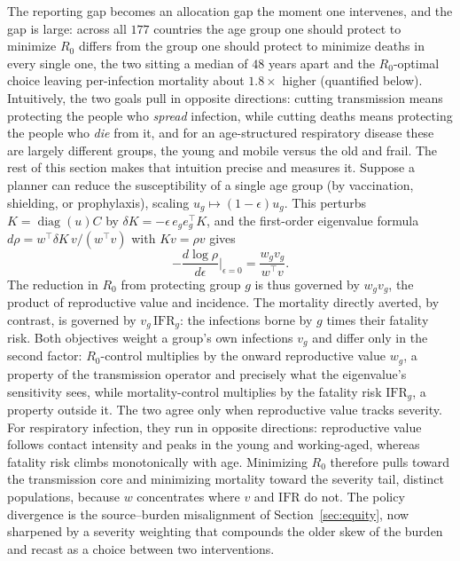 \documentclass[12pt]{article}
\begin{document}
The reporting gap becomes an allocation gap the moment one intervenes, and the gap is large: across all $177$ countries the age group one should protect to minimize $R_0$ differs from the group one should protect to minimize deaths in every single one, the two sitting a median of $48$ years apart and the $R_0$-optimal choice leaving per-infection mortality about $1.8\times$ higher (quantified below). Intuitively, the two goals pull in opposite directions: cutting transmission means protecting the people who \emph{spread} infection, while cutting deaths means protecting the people who \emph{die} from it, and for an age-structured respiratory disease these are largely different groups, the young and mobile versus the old and frail. The rest of this section makes that intuition precise and measures it. Suppose a planner can reduce the susceptibility of a single age group (by vaccination, shielding, or prophylaxis), scaling $u_g\mapsto(1-\epsilon)u_g$. This perturbs $K=\operatorname{diag}(u)C$ by $\delta K=-\epsilon\,e_g e_g^{\top}K$, and the first-order eigenvalue formula $d\rho=w^{\top}\delta K\,v/(w^{\top}v)$ with $Kv=\rho v$ gives
\begin{equation}
-\frac{d\log\rho}{d\epsilon}\bigg|_{\epsilon=0}=\frac{w_g v_g}{w^{\top}v}.
\end{equation}
The reduction in $R_0$ from protecting group $g$ is thus governed by $w_g v_g$, the product of reproductive value and incidence. The mortality directly averted, by contrast, is governed by $v_g\,\mathrm{IFR}_g$: the infections borne by $g$ times their fatality risk. Both objectives weight a group's own infections $v_g$ and differ only in the second factor: $R_0$-control multiplies by the onward reproductive value $w_g$, a property of the transmission operator and precisely what the eigenvalue's sensitivity sees, while mortality-control multiplies by the fatality risk $\mathrm{IFR}_g$, a property outside it. The two agree only when reproductive value tracks severity. For respiratory infection, they run in opposite directions: reproductive value follows contact intensity and peaks in the young and working-aged, whereas fatality risk climbs monotonically with age. Minimizing $R_0$ therefore pulls toward the transmission core and minimizing mortality toward the severity tail, distinct populations, because $w$ concentrates where $v$ and $\mathrm{IFR}$ do not. The policy divergence is the source--burden misalignment of Section~\ref{sec:equity}, now sharpened by a severity weighting that compounds the older skew of the burden and recast as a choice between two interventions.
\end{document}

